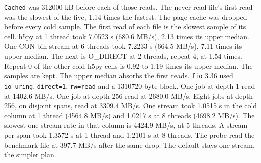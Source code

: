 \texttt{Cached} was 312000 kB before each of those reads.
The never-read file's first read was the slowest of the five, 1.14 times
the fastest.
The page cache was dropped before every cold sample.
The first read of each file is the slowest sample of its
cell.
h5py at 1 thread took 7.0523 s (680.6 MB/s), 2.13 times its upper
median.
One CON-bin stream at 6 threads took 7.2233 s (664.5 MB/s), 7.11 times
its upper median.
The next is O\_DIRECT at 2 threads, repeat 4, at 1.54 times.
Repeat 0 of the other cold h5py cells is 0.92 to 1.19 times its
upper median.
The samples are kept.
The upper median absorbs the first reads.
\texttt{fio} 3.36 used \texttt{io\_uring}, \texttt{direct=1},
\texttt{rw=read} and a 1310720-byte block.
One job at depth 1 read at 1402.6 MB/s.
One job at depth 256 read at 2680.0 MB/s.
Eight jobs at depth 256, on disjoint spans, read at 3309.4 MB/s.
One stream took 1.0515 s in the cold column at 1 thread (4564.8
MB/s) and 1.0217 s at 8 threads (4698.2 MB/s).
The slowest one-stream rate in that column is 4424.9 MB/s, at 5 threads.
A stream per span took 1.3572 s at 1 thread and 1.2101 s at 8 threads.
The probe read the benchmark file at 397.7 MB/s after the same drop.
The default stays one stream, the simpler plan.


